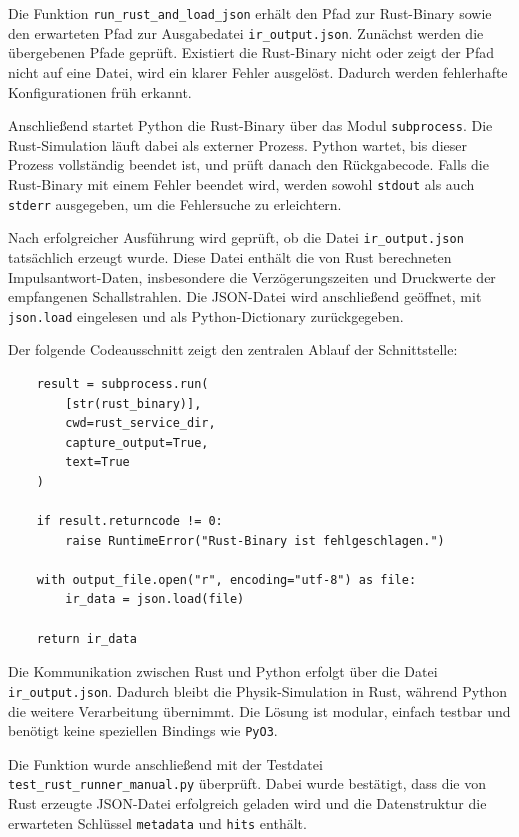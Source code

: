 \documentclass{article}
\begin{document}
    \vspace{0.3em}
    Die Funktion \texttt{run\_rust\_and\_load\_json} erhält den Pfad zur Rust-Binary sowie den erwarteten Pfad zur Ausgabedatei \texttt{ir\_output.json}. Zunächst werden die übergebenen Pfade geprüft. Existiert die Rust-Binary nicht oder zeigt der Pfad nicht auf eine Datei, wird ein klarer Fehler ausgelöst. Dadurch werden fehlerhafte Konfigurationen früh erkannt.

    \vspace{0.3em}
    Anschließend startet Python die Rust-Binary über das Modul \texttt{subprocess}. Die Rust-Simulation läuft dabei als externer Prozess. Python wartet, bis dieser Prozess vollständig beendet ist, und prüft danach den Rückgabecode. Falls die Rust-Binary mit einem Fehler beendet wird, werden sowohl \texttt{stdout} als auch \texttt{stderr} ausgegeben, um die Fehlersuche zu erleichtern.

    \vspace{0.3em}
    Nach erfolgreicher Ausführung wird geprüft, ob die Datei \texttt{ir\_output.json} tatsächlich erzeugt wurde. Diese Datei enthält die von Rust berechneten Impulsantwort-Daten, insbesondere die Verzögerungszeiten und Druckwerte der empfangenen Schallstrahlen. Die JSON-Datei wird anschließend geöffnet, mit \texttt{json.load} eingelesen und als Python-Dictionary zurückgegeben.


    Der folgende Codeausschnitt zeigt den zentralen Ablauf der Schnittstelle:
    \vspace{0.3em}

    \begin{lstlisting}
    result = subprocess.run(
        [str(rust_binary)],
        cwd=rust_service_dir,
        capture_output=True,
        text=True
    )

    if result.returncode != 0:
        raise RuntimeError("Rust-Binary ist fehlgeschlagen.")

    with output_file.open("r", encoding="utf-8") as file:
        ir_data = json.load(file)

    return ir_data
    \end{lstlisting}

    Die Kommunikation zwischen Rust und Python erfolgt über die Datei
    \texttt{ir\_output.json}. Dadurch bleibt die Physik-Simulation in Rust,
    während Python die weitere Verarbeitung übernimmt. Die Lösung ist modular,
    einfach testbar und benötigt keine speziellen Bindings wie \texttt{PyO3}.

    Die Funktion wurde anschließend mit der Testdatei
    \texttt{test\_rust\_runner\_manual.py} überprüft. Dabei wurde bestätigt,
    dass die von Rust erzeugte JSON-Datei erfolgreich geladen wird und die
    Datenstruktur die erwarteten Schlüssel \texttt{metadata} und \texttt{hits}
    enthält.
\end{document}
